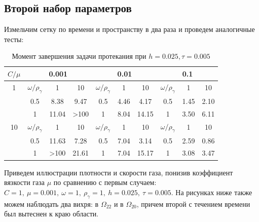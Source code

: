 \documentclass[specialist,subf,href,colorlinks=true,12pt
,times,mtpro,specialist
]{disser}
\begin{document}
\subsection {Второй набор параметров}

Измельчим сетку по времени и пространству в два раза и проведем аналогичные тесты:

\begin{table}[H]
\caption{Момент завершения задачи протекания при $h = 0.025, \tau = 0.005$}
\begin{center}
\begin{tabular}{|c|c|c|c|c|c|c|c|c|c|}
\hline
$C / \mu$ & \multicolumn{3}{c|}{0.001} & \multicolumn{3}{c|}{0.01} & \multicolumn{3}{c|}{0.1} \\
\hline
1 & $\omega / \rho_\gamma$ & 1 & 10 & $\omega / \rho_\gamma$ & 1 & 10 & $\omega / \rho_\gamma$ & 1 & 10  \\
\cline{2-10}
  & 0.5 & 8.38 & 9.47 & 0.5 & 4.46  & 4.17  & 0.5 & 1.45  & 2.10   \\
\cline{2-10}
  & 1 & 11.04  & >100  & 1 & 8.04  & 14.15  & 1 & 3.50  & 6.11   \\
\hline
10 & $\omega / \rho_\gamma$ & 1 & 10 & $\omega / \rho_\gamma$ & 1 & 10 & $\omega / \rho_\gamma$ & 1 & 10  \\
\cline{2-10}
  & 0.5 & 11.63 & 7.28 & 0.5 & 7.04 & 3.14 & 0.5 & 2.59 & 0.86   \\
\cline{2-10}
  & 1 & >100 & 21.61  & 1 & 7.04 & 15.17 & 1 & 3.08 & 3.47  \\
\hline
\end{tabular}
\end{center}
\end{table}

Приведем иллюстрации плотности и скорости газа, понизив коэффициент вязкости газа $\mu$ по сравнению с первым случаем: $C = 1,\ \mu = 0.001,\ \omega = 1,\ \rho_\gamma = 1,\ h = 0.025,\ \tau = 0.005$. 
На рисунках ниже также можем наблюдать два вихря: в $\Omega_{22}$ и в $\Omega_{20}$, причем второй с течением времени был вытеснен к краю области.
\end{document}
